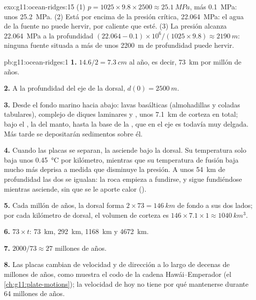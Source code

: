 \begin{solution}{exo:g11:ocean-ridges:15}
(1) $p = 1025 \times 9.8 \times 2500 \approx \qty{25.1}{MPa}$, más
\qty{0.1}{MPa}: unos \qty{25.2}{MPa}. (2) Está por encima de la presión
crítica, \qty{22.064}{MPa}: el agua de la fuente no puede hervir, por caliente
que esté. (3) La presión alcanza \qty{22.064}{MPa} a la profundidad
$(22.064 - 0.1) \times 10^6/(1025 \times 9.8) \approx \qty{2190}{m}$: ninguna
fuente situada a más de unos \qty{2200}{m} de profundidad puede hervir.
\end{solution}

\begin{solution}{pb:g11:ocean-ridges:1}
\textbf{1.} $14.6/2 = \qty{7.3}{cm}$ al año, es decir, \qty{73}{km} por millón
de años.

\textbf{2.} A la profundidad del eje de la dorsal, $d(0) = \qty{2500}{m}$.

\textbf{3.} Desde el fondo marino hacia abajo: lavas basálticas (almohadillas
y coladas tabulares), complejo de diques laminares y , unos \qty{7.1}{km}
de corteza en total; bajo el , la  del manto, hasta la base de
la , que en el eje es todavía muy delgada. Más tarde se depositarán
sedimentos sobre él.

\textbf{4.} Cuando las placas se separan, la  asciende bajo la
dorsal. Su temperatura solo baja unos \qty{0.45}{\celsius} por kilómetro,
mientras que su temperatura de fusión baja mucho más deprisa a medida que
disminuye la presión. A unos \qty{54}{km} de profundidad las dos se igualan:
la roca empieza a fundirse, y sigue fundiéndose mientras asciende, sin que se
le aporte calor ().

\textbf{5.} Cada millón de años, la dorsal forma $2 \times 73 = \qty{146}{km}$
de fondo a sus dos lados; por cada kilómetro de dorsal, el volumen de corteza
es $146 \times 7.1 \times 1 \approx \qty{1040}{km^3}$.

\textbf{6.} $73 \times t$: \qty{73}{km}, \qty{292}{km}, \qty{1168}{km} y
\qty{4672}{km}.

\textbf{7.} $2000/73 \approx 27$ millones de años.

\textbf{8.} Las placas cambian de velocidad y de dirección a lo largo de
decenas de millones de años, como muestra el codo de la cadena
Hawái--Emperador (el \cref{ch:g11:plate-motions}); la velocidad de hoy no
tiene por qué mantenerse durante 64 millones de años.


\end{solution}
